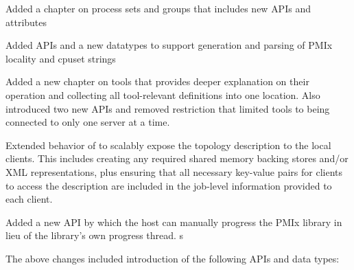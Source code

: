 \begin{compactitemize}
    \item Added a chapter on process sets and groups that includes new \acp{API} and attributes
    \item Added \acp{API} and a new datatypes to support generation and parsing of \ac{PMIx} locality and cpuset strings
    \item Added a new chapter on tools that provides deeper explanation on their operation and collecting all tool-relevant definitions into one location. Also introduced two new \acp{API} and removed restriction that limited tools to being connected to only one server at a time.
    \item Extended behavior of  to scalably expose the topology description to the local clients. This includes creating any required shared memory backing stores and/or \ac{XML} representations, plus ensuring that all necessary key-value pairs for clients to access the description are included in the job-level information provided to each client.
    \item Added a new \ac{API} by which the host can manually progress the \ac{PMIx} library in lieu of the library's own progress thread.
s\end{compactitemize}

The above changes included introduction of the following \acp{API} and data types:

